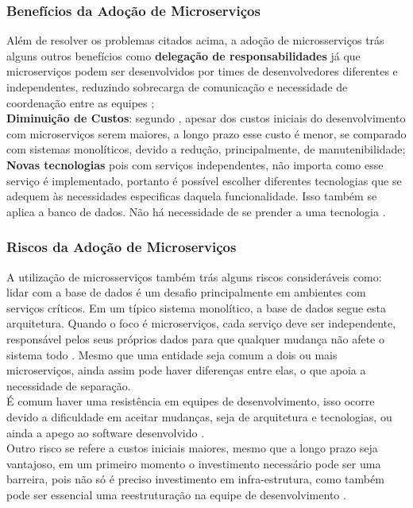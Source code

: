 \documentclass[12pt]{article}
\begin{document}
\subsubsection{Benefícios da Adoção de Microserviços}
Além de resolver os problemas citados acima, a adoção de microsserviços trás alguns outros benefícios como \textbf{delegação de responsabilidades} já que microserviços podem ser desenvolvidos por times de desenvolvedores diferentes e independentes, reduzindo sobrecarga de comunicação e necessidade de coordenação entre as equipes \cite{Taibi}; 
\\
\textbf{Diminuição de Custos}: segundo \cite{Taibi}, apesar dos custos iniciais do desenvolvimento com microserviços serem maiores, a longo prazo esse custo é menor, se comparado com sistemas monolíticos, devido a redução, principalmente, de manutenibilidade; 
\\
\textbf{Novas tecnologias} pois com serviços independentes, não importa como esse serviço é implementado, portanto é possível escolher diferentes tecnologias que se adequem às necessidades especificas daquela funcionalidade. Isso também se aplica a banco de dados. Não há necessidade de se prender a uma tecnologia \cite{Richter2017a}. 


\subsubsection{Riscos da Adoção de Microserviços}
A utilização de microsserviços também trás alguns riscos consideráveis como: lidar com a base de dados é um desafio principalmente em ambientes com serviços críticos. Em um típico sistema monolítico, a base de dados segue esta arquitetura. Quando o foco é microserviços, cada serviço deve ser independente, responsável pelos seus próprios dados para que qualquer mudança não afete o sistema todo \cite{Kholy2019}. Mesmo que uma entidade seja comum a dois ou mais microserviços, ainda assim pode haver diferenças entre elas, o que apoia a necessidade de separação. 
\\É comum haver uma resistência em equipes de desenvolvimento, isso ocorre devido a dificuldade em aceitar mudanças, seja de arquitetura e tecnologias, ou ainda a apego ao software desenvolvido \cite{Taibi}. 
\\Outro risco se refere a custos iniciais maiores, mesmo que a longo prazo seja vantajoso, em um primeiro momento o investimento necessário pode ser uma barreira, pois não só é preciso investimento em infra-estrutura, como também pode ser essencial uma reestruturação na equipe de desenvolvimento \cite{Taibi}.
\end{document}
